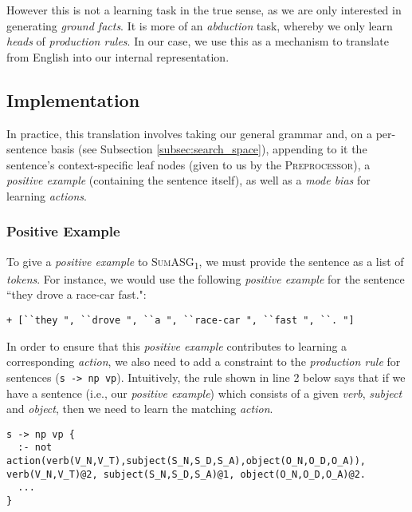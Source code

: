 However this is not a learning task in the true sense, as we are only interested in generating \textit{ground facts}. It is more of an \textit{abduction} task, whereby we only learn \textit{heads} of \textit{production rules}. In our case, we use this as a mechanism to translate from English into our internal representation.

\subsection{Implementation}

In practice, this translation involves taking our general grammar and, on a per-sentence basis (see Subsection \ref{subsec:search_space}), appending to it the sentence's context-specific leaf nodes (given to us by the \textsc{Preprocessor}), a \textit{positive example} (containing the sentence itself), as well as a \textit{mode bias} for learning \textit{actions}.

\subsubsection*{Positive Example}

To give a \textit{positive example} to \textsc{SumASG\textsubscript{1}}, we must provide the sentence as a list of \textit{tokens}. For instance, we would use the following \textit{positive example} for the sentence ``they drove a race-car fast.":

\begin{displayquote}
\begin{lstlisting}[numbers=none]
+ [``they ", ``drove ", ``a ", ``race-car ", ``fast ", ``. "]
\end{lstlisting}
\end{displayquote}

\noindent
In order to ensure that this \textit{positive example} contributes to learning a corresponding \textit{action}, we also need to add a constraint to the \textit{production rule} for sentences (\texttt{s -> np vp}). Intuitively, the rule shown in line 2 below says that if we have a sentence (i.e., our \textit{positive example}) which consists of a given \textit{verb}, \textit{subject} and \textit{object}, then we need to learn the matching \textit{action}.

\begin{displayquote}
\begin{lstlisting}
s -> np vp {
  :- not action(verb(V_N,V_T),subject(S_N,S_D,S_A),object(O_N,O_D,O_A)), verb(V_N,V_T)@2, subject(S_N,S_D,S_A)@1, object(O_N,O_D,O_A)@2.
  ...
}
\end{lstlisting}
\end{displayquote}

